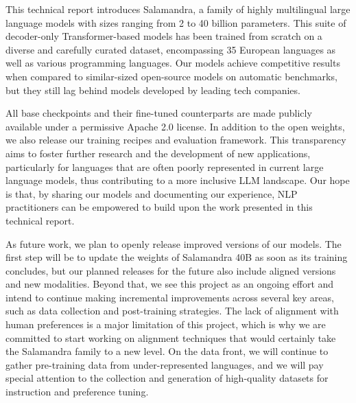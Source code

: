 This technical report introduces Salamandra, a family of highly multilingual large language models with sizes ranging from 2 to 40 billion parameters. This suite of decoder-only Transformer-based models has been trained from scratch on a diverse and carefully curated dataset, encompassing 35 European languages as well as various programming languages. Our models achieve competitive results when compared to similar-sized open-source models on automatic benchmarks, but they still lag behind models developed by leading tech companies.

All base checkpoints and their fine-tuned counterparts are made publicly available under a permissive Apache 2.0 license. In addition to the open weights, we also release our training recipes and evaluation framework. This transparency aims to foster further research and the development of new applications, particularly for languages that are often poorly represented in current large language models, thus contributing to a more inclusive LLM landscape. Our hope is that, by sharing our models and documenting our experience, NLP practitioners can be empowered to build upon the work presented in this technical report.

As future work, we plan to openly release improved versions of our models. The first step will be to update the weights of Salamandra 40B as soon as its training concludes, but our planned releases for the future also include aligned versions and new modalities. Beyond that, we see this project as an ongoing effort and intend to continue making incremental improvements across several key areas, such as data collection and post-training strategies. The lack of alignment with human preferences is a major limitation of this project, which is why we are committed to start working on alignment techniques that would certainly take the Salamandra family to a new level. On the data front, we will continue to gather pre-training data from under-represented languages, and we will pay special attention to the collection and generation of high-quality datasets for instruction and preference tuning.

